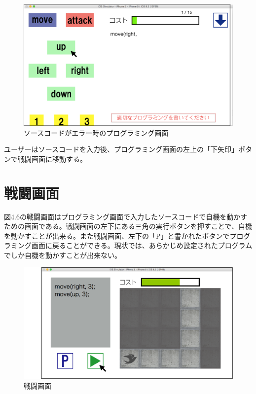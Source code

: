 \documentclass[openany,11pt,papersize]{jsbook}
\begin{document}
\begin{figure}[H]
\begin{center}
\includegraphics[width=12cm, bb=0 0 1024 598]{img/4thParagraph/error.png}
\end{center}
\caption{ソースコードがエラー時のプログラミング画面}
\end{figure}
ユーザーはソースコードを入力後、プログラミング画面の左上の「下矢印」ボタンで戦闘画面に移動する。


\section{戦闘画面}
図4.6の戦闘画面はプログラミング画面で入力したソースコードで自機を動かすための画面である。戦闘画面の左下にある三角の実行ボタンを押すことで、自機を動かすことが出来る。また戦闘画面、左下の「P」と書かれたボタンでプログラミング画面に戻ることができる。現状では、あらかじめ設定されたプログラムでしか自機を動かすことが出来ない。

\begin{figure}[H]
\begin{center}
\includegraphics[width=12cm, bb=0 0 1136 662]{img/4thParagraph/Prog-ra_Battle.png}
\end{center}
\caption{戦闘画面}
\end{figure}
\end{document}
